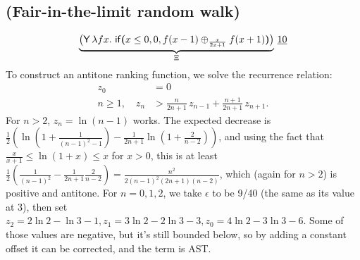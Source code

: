 \subsection*{ (Fair-in-the-limit random walk) \citep[\S 5.3]{DBLP:journals/pacmpl/McIverMKK18}}
\[
\underbrace{\big
(\tY \, \lambda f x .\ 
\tif{x \leq 0}{0}{f(x - 1) \oplus_{\frac{x}{2x+1}} f(x + 1)} \big)}_{\Xi} 
\, \underline{10}
\]
To construct an antitone ranking function, we solve the recurrence relation:
\begin{align*}
z_0 &= 0\\
n \geq 1, \quad z_n &> \textstyle \frac{n}{2n + 1} \, z_{n-1} + \frac{n+1}{2n + 1} \, z_{n+1}.
\end{align*}
For $n > 2$, $z_n = \ln(n-1)$ works. The expected decrease is $\frac 1 2(\ln(1+\frac 1 {(n-1)^2-1}) - \frac 1 {2n+1} \ln(1 + \frac 2 {n-2}))$, and using the fact that $\frac x {x+1} \leq \ln (1+x) \leq x$ for $x > 0$, this is at least $\frac 1 2(\frac 1 {(n-1)^2} - \frac 1 {2n + 1} \frac 2 {n-2}) = \frac {n^2}{2(n-1)^2(2n+1)(n-2)}$, which (again for $n > 2$) is positive and antitone. For $n = 0, 1, 2$, we take $\epsilon$ to be 9/40 (the same as its value at 3), then set $z_2 = 2 \ln 2 - \ln 3 - 1, z_1 = 3 \ln 2 - 2 \ln 3 - 3, z_0 = 4 \ln 2 - 3 \ln 3 - 6$. Some of those values are negative, but it's still bounded below, so by adding a constant offset it can be corrected, and the term is AST.



